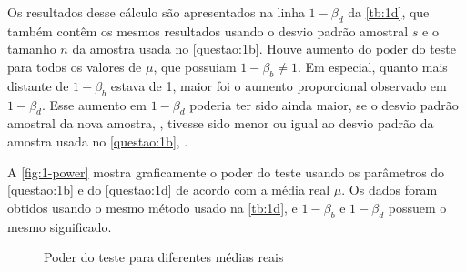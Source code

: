 
Os resultados desse cálculo são apresentados na linha $1 - \beta_d$ da \autoref{tb:1d}, que também contêm os mesmos resultados usando o desvio padrão amostral $s$ e o tamanho $n$ da amostra usada no \autoref{questao:1b}. Houve aumento do poder do teste para todos os valores de $\mu$, que possuiam $1 - \beta_b \neq 1$. Em especial, quanto mais distante de $1 - \beta_b$ estava de 1, maior foi o aumento proporcional observado em $1 - \beta_d$. Esse aumento em $1 - \beta_d$ poderia ter sido ainda maior, se o desvio padrão amostral da nova amostra, \UMDs, tivesse sido menor ou igual ao desvio padrão da amostra usada no \autoref{questao:1b}, \UMAs.



A \autoref{fig:1-power} mostra graficamente o poder do teste usando os parâmetros do \autoref{questao:1b} e do \autoref{questao:1d} de acordo com a média real $\mu$. Os dados foram obtidos usando o mesmo método usado na \autoref{tb:1d}, e $1 - \beta_b$ e $1 - \beta_d$ possuem o mesmo significado.

\begin{figure}[ht]
  \centering
  
  \caption{Poder do teste para diferentes médias reais}
  \label{fig:1-power}
\end{figure}

